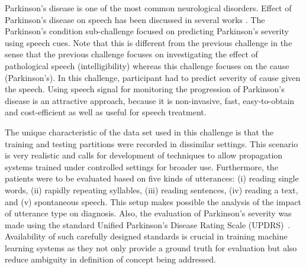 \documentclass{article}
\begin{document}
Parkinson's disease is one of the most common neurological disorders.
Effect of Parkinson's disease on speech has been discussed in several works \cite{lieberman1992speech,kempler2002effect}.
The Parkinson's condition sub-challenge focused on predicting Parkinson's severity using speech cues.
Note that this is different from the previous challenge in the sense that the previous challenge focuses on investigating the effect of pathological speech (intelligibility) whereas this challenge focuses on the cause (Parkinson's). 
In this challenge, participant had to predict severity of cause given the speech.
Using speech signal for monitoring the progression of Parkinson's disease is an attractive approach, because it is non-invasive, fast, easy-to-obtain and cost-efficient as well as useful for speech treatment.

The unique characteristic of the data set used in this challenge is that the training and testing partitions were recorded in dissimilar settings.
This scenario is very realistic and calls for development of techniques to allow propagation systems trained under controlled settings for broader use.
Furthermore, the patients were to be evaluated based on five kinds of utterances: (i) reading single words, (ii) rapidly repeating syllables, (iii) reading sentences, (iv) reading a text, and (v) spontaneous speech.
This setup makes possible the analysis of the impact of utterance type on diagnosis.
Also, the evaluation of Parkinson's severity was made using the standard Unified Parkinson's Disease Rating Scale (UPDRS)~\cite{stebbins1998factor}.
Availability of such carefully designed standards is crucial in training machine learning systems as they not only provide a ground truth for evaluation but also reduce ambiguity in definition of concept being addressed.
\end{document}
